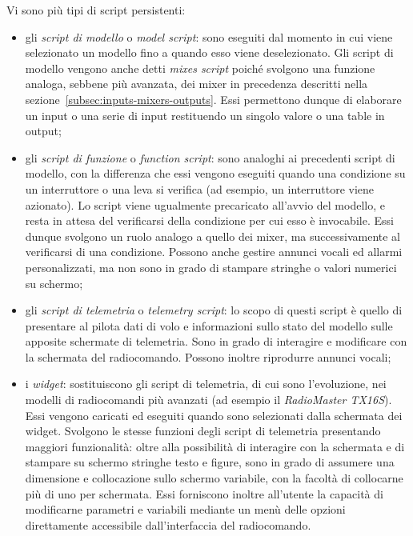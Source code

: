 \documentclass[a4paper, 12pt]{report} %
\begin{document}
Vi sono più tipi di script persistenti:
\begin{itemize}
        \item gli \emph{script di modello} o \emph{model script}: sono eseguiti dal momento in cui viene selezionato un modello fino a quando esso viene deselezionato. Gli script di modello vengono anche detti \emph{mixes script} poiché svolgono una funzione analoga, sebbene più avanzata, dei mixer in precedenza descritti nella sezione~\ref{subsec:inputs-mixers-outputs}. Essi permettono dunque di elaborare un input o una serie di input restituendo un singolo valore o una table in output;

        \item gli \emph{script di funzione} o \emph{function script}: sono analoghi ai precedenti script di modello, con la differenza che essi vengono eseguiti quando una condizione su un interruttore o una leva si verifica (ad esempio, un interruttore viene azionato). Lo script viene ugualmente precaricato all'avvio del modello, e resta in attesa del verificarsi della condizione per cui esso è invocabile. Essi dunque svolgono un ruolo analogo a quello dei mixer, ma successivamente al verificarsi di una condizione. Possono anche gestire annunci vocali ed allarmi personalizzati, ma non sono in grado di stampare stringhe o valori numerici su schermo;

        \item gli \emph{script di telemetria} o \emph{telemetry script}: lo scopo di questi script è quello di presentare al pilota dati di volo e informazioni sullo stato del modello sulle apposite schermate di telemetria. Sono in grado di interagire e modificare con la schermata del radiocomando. Possono inoltre riprodurre annunci vocali;

        \item i \emph{widget}: sostituiscono gli script di telemetria, di cui sono l'evoluzione, nei modelli di radiocomandi più avanzati (ad esempio il \emph{RadioMaster TX16S}). Essi vengono caricati ed eseguiti quando sono selezionati dalla schermata dei widget. Svolgono le stesse funzioni degli script di telemetria presentando maggiori funzionalità: oltre alla possibilità di interagire con la schermata e di stampare su schermo stringhe testo e figure, sono in grado di assumere una dimensione e collocazione sullo schermo variabile, con la facoltà di collocarne più di uno per schermata. Essi forniscono inoltre all'utente la capacità di modificarne parametri e variabili mediante un menù delle opzioni direttamente accessibile dall'interfaccia del radiocomando.
\end{itemize}
\end{document}
